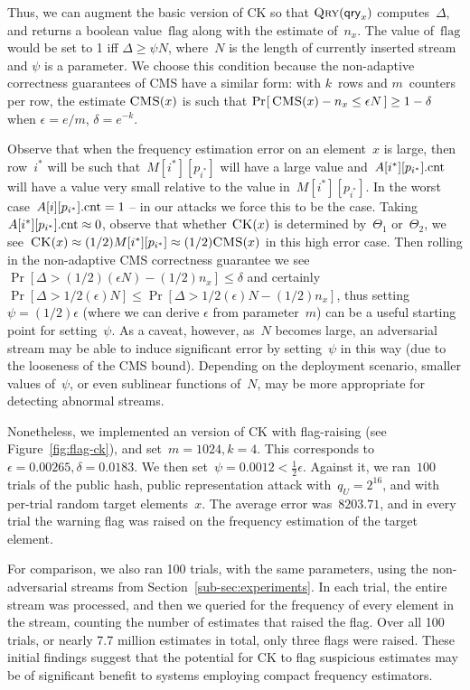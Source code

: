 Thus, we can augment the basic version of CK so that $\textnormal{\textsc{Qry}}(\mathsf{qry}_x)$ 
computes~$\Delta$, and returns a boolean value~$\mathrm{flag}$ along with the estimate of~$n_x$.  The value of~$\mathrm{flag}$ would be set to 1 iff $\Delta \geq \psi N$, where~$N$ is the length of currently inserted stream and $\psi$ is a parameter.  We choose this condition because the non-adaptive correctness guarantees of CMS have a similar form: with $k$~rows and $m$~counters per row, the estimate $\textnormal{\textsc{CMS}}(x)$ is such that $\Pr\hspace{-1pt}\left[\,\textnormal{\textsc{CMS}}(x) - n_x \leq \epsilon N\,\right] \geq 1-\delta$ when $\epsilon = e/m$, $\delta=e^{-k}$. 

Observe that when the frequency estimation error on an element~$x$ is large, then row~$i^*$ will be such that~$M[i^*][p_{i^*}]$ will have a large value and~$A[i^*][p_{i^*}].\textup{cnt}$ will have a value very small relative to the value in~$M[i^*][p_{i^*}]$. In the worst case~$A[i][p_{i^*}].\textup{cnt}=1$ -- in our attacks we force this to be the case. Taking~$A[i^*][p_{i^*}].\textup{cnt} \approx 0$, observe that whether $\textnormal{\textsc{CK}}(x)$ is determined by~$\Theta_1$ or~$\Theta_2$, we see~$\textnormal{\textsc{CK}}(x) \approx (1/2)M[i^*][p_{i^*}] \approx (1/2)\textnormal{\textsc{CMS}}(x)$ in this high error case. Then rolling in the non-adaptive CMS correctness guarantee we see $\Pr[\Delta > (1/2)(\epsilon N) - (1/2)n_x] \leq \delta$ and certainly $\Pr[\Delta > 1/2(\epsilon)N] \leq \Pr[\Delta > 1/2(\epsilon)N - (1/2)n_x]$, thus setting~$\psi = (1/2)\epsilon$ (where we can derive $\epsilon$ from parameter~$m$) can be a useful starting point for setting~$\psi$. As a caveat, however, as~$N$ becomes large, an adversarial stream may be able to induce significant error by setting~$\psi$ in this way (due to the looseness of the CMS bound).  Depending on the deployment scenario, smaller values of~$\psi$, or even sublinear functions of~$N$, may be more appropriate for detecting abnormal streams.

Nonetheless, we implemented an version of CK with flag-raising (see Figure~\ref{fig:flag-ck}), and set~$m=1024,k=4$. This corresponds to~$\epsilon=0.00265,\delta=0.0183$. We then set~$\psi = 0.0012 < \frac{1}{2} \epsilon$. Against it, we ran~$100$ trials of the public hash, public representation attack with~$q_U = 2^{16}$, and with per-trial random target elements~$x$. The average error was~$8203.71$, and in every trial the warning flag was raised on the frequency estimation of the target element.

For comparison, we also ran 100 trials, with the same parameters, using the non-adversarial streams from Section~\ref{sub-sec:experiments}. In each trial, the entire stream was processed, and then we queried for the frequency of every element in the stream, counting the number of estimates that raised the flag.  Over all 100 trials, or nearly 7.7 million estimates in total, only three flags were raised.  These initial findings suggest that the potential for CK to flag suspicious estimates may be of significant benefit to systems employing compact frequency estimators.
